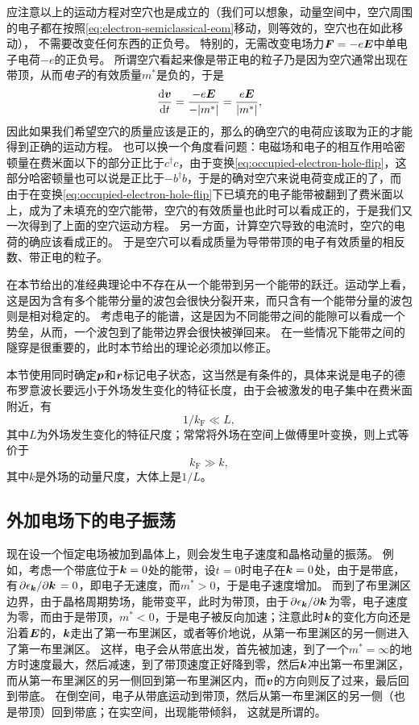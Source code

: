 应注意以上的运动方程对空穴也是成立的（我们可以想象，动量空间中，空穴周围的电子都在按照\eqref{eq:electron-semiclassical-eom}移动，则等效的，空穴也在如此移动），
不需要改变任何东西的正负号。
特别的，无需改变电场力$\vb*{F} = - e \vb*{E}$中单电子电荷$-e$的正负号。
所谓空穴看起来像是带正电的粒子乃是因为空穴通常出现在带顶，从而\emph{电子}的有效质量$m^*$是负的，于是
\begin{equation}
    \dv{\vb*{v}}{t} = \frac{- e \vb*{E}}{- \abs{m^*}} = \frac{e \vb*{E}}{\abs{m^*}},
\end{equation}
因此如果我们希望空穴的质量应该是正的，那么的确空穴的电荷应该取为正的才能得到正确的运动方程。
也可以换一个角度看问题：电磁场和电子的相互作用哈密顿量在费米面以下的部分正比于$c^\dagger c$，由于变换\eqref{eq:occupied-electron-hole-flip}，这部分哈密顿量也可以说是正比于$- b^\dagger b$，于是的确对空穴来说电荷变成正的了，而由于在变换\eqref{eq:occupied-electron-hole-flip}下已填充的电子能带被翻到了费米面以上，成为了未填充的空穴能带，空穴的有效质量也此时可以看成正的，于是我们又一次得到了上面的空穴运动方程。
另一方面，计算空穴导致的电流时，空穴的电荷的确应该看成正的。
于是空穴可以看成质量为导带带顶的电子有效质量的相反数、带正电的粒子。

在本节给出的准经典理论中不存在从一个能带到另一个能带的跃迁。运动学上看，这是因为含有多个能带分量的波包会很快分裂开来，而只含有一个能带分量的波包则是相对稳定的。
考虑电子的能谱，这是因为不同能带之间的能隙可以看成一个势垒，从而，一个波包到了能带边界会很快被弹回来。
在一些情况下能带之间的隧穿是很重要的，此时本节给出的理论必须加以修正。

本节使用同时确定$\vb*{p}$和$\vb*{r}$标记电子状态，这当然是有条件的，具体来说是电子的德布罗意波长要远小于外场发生变化的特征长度，由于会被激发的电子集中在费米面附近，有
\begin{equation}
    1 / k_\text{F} \ll L,
\end{equation}
其中$L$为外场发生变化的特征尺度；常常将外场在空间上做傅里叶变换，则上式等价于
\begin{equation}
    k_\text{F} \gg k,
\end{equation}
其中$k$是外场的动量尺度，大体上是$1/L$。

\subsection{外加电场下的电子振荡}

现在设一个恒定电场被加到晶体上，则会发生电子速度和晶格动量的振荡。
例如，考虑一个带底位于$\vb*{k}=0$处的能带，设$t=0$时电子在$\vb*{k}=0$处，由于是带底，有$\pdv*{\epsilon_{\vb*{k}}}{\vb*{k}} = 0$，即电子无速度，而$m^* > 0$，于是电子速度增加。
而到了布里渊区边界，由于晶格周期势场，能带变平，此时为带顶，由于$\pdv*{\epsilon_{\vb*{k}}}{\vb*{k}}$为零，电子速度为零，而由于是带顶，$m^* < 0$，于是电子被反向加速；注意此时$\vb*{k}$的变化方向还是沿着$\vb*{E}$的，$\vb*{k}$走出了第一布里渊区，或者等价地说，从第一布里渊区的另一侧进入了第一布里渊区。
这样，电子会从带底出发，首先被加速，到了一个$m^* = \infty$的地方时速度最大，然后减速，到了带顶速度正好降到零，然后$\vb*{k}$冲出第一布里渊区，而从第一布里渊区的另一侧回到第一布里渊区内，而$\vb*{v}$的方向则反了过来，最后回到带底。
在倒空间，电子从带底运动到带顶，然后从第一布里渊区的另一侧（也是带顶）回到带底；在实空间，出现能带倾斜，%
这就是所谓的。

